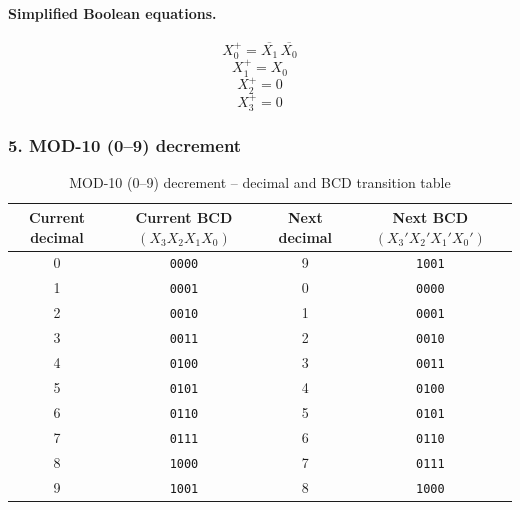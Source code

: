 \documentclass[12pt,letterpaper]{article}
\begin{document}
\paragraph{Simplified Boolean equations.}
\[X_0^+=\overline{X_1}\,\overline{X_0}\]
\[X_1^+=X_0\]
\[X_2^+=0\]
\[X_3^+=0\]
\subsubsection{5. MOD-10 (0--9) decrement}
\begin{table}[H]\centering
\caption{MOD-10 (0--9) decrement -- decimal and BCD transition table}
\label{tab:kmap-mod10-dec-trans}
\scriptsize
\begin{tabular}{c c c c}\toprule
Current decimal & Current BCD $(X_3X_2X_1X_0)$ & Next decimal & Next BCD $(X_3'X_2'X_1'X_0')$ \\
\midrule
0 & \texttt{0000} & 9 & \texttt{1001} \\
1 & \texttt{0001} & 0 & \texttt{0000} \\
2 & \texttt{0010} & 1 & \texttt{0001} \\
3 & \texttt{0011} & 2 & \texttt{0010} \\
4 & \texttt{0100} & 3 & \texttt{0011} \\
5 & \texttt{0101} & 4 & \texttt{0100} \\
6 & \texttt{0110} & 5 & \texttt{0101} \\
7 & \texttt{0111} & 6 & \texttt{0110} \\
8 & \texttt{1000} & 7 & \texttt{0111} \\
9 & \texttt{1001} & 8 & \texttt{1000} \\
\bottomrule
\end{tabular}
\end{table}
\end{document}
